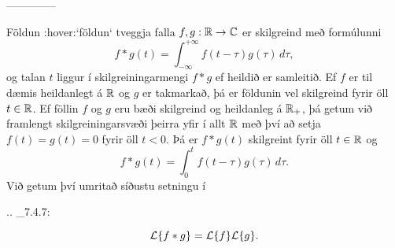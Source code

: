 --------------



Földun :hover:`földun` tveggja falla $f, g: {\mathbb R}\to {\mathbb C}$  er skilgreind
með formúlunni 
 $$f*g(t)=\int_{-\infty}^{+\infty}f(t-\tau)g(\tau) \, d\tau,
 $$
og talan $t$ liggur í skilgreiningarmengi $f*g$ ef heildið er
samleitið.  Ef $f$ er til dæmis heildanlegt  á ${\mathbb R}$ og $g$ er
takmarkað, þá er földunin vel skilgreind fyrir öll $t\in {\mathbb R}$.
Ef föllin $f$ og $g$ eru bæði skilgreind og heildanleg á  ${\mathbb R}_+$, þá
getum við framlengt  skilgreiningarsvæði þeirra yfir í allt ${\mathbb R}$ með
því að setja 
$f(t)=g(t)=0$ fyrir öll $t<0$.  Þá er $f*g(t)$  skilgreint fyrir öll
$t\in {\mathbb R}$ og $$ f*g(t)= \int_0^tf(t-\tau)g(\tau)\, d\tau.$$
Við getum því umritað síðustu  setningu í 

.. _7.4.7:

\begin{equation*}
{\cal L}\{f*g\}={\cal L}\{f\}{\cal L}\{g\}.
\end{equation*}


